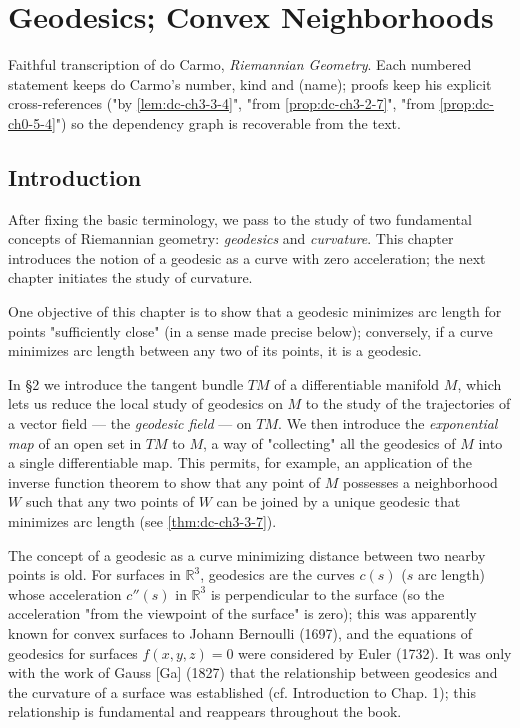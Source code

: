 \chapter{Geodesics; Convex Neighborhoods}
\label{chap:dc-geodesics-convex-neighborhoods}

Faithful transcription of do Carmo, \emph{Riemannian Geometry}. Each numbered
statement keeps do Carmo's number, kind and (name); proofs keep his explicit
cross-references ("by \cref{lem:dc-ch3-3-4}", "from \cref{prop:dc-ch3-2-7}", "from \cref{prop:dc-ch0-5-4}") so the dependency graph is recoverable from the text.

\section{Introduction}

After fixing the basic terminology, we pass to the study of two fundamental
concepts of Riemannian geometry: \emph{geodesics} and \emph{curvature}. This chapter
introduces the notion of a geodesic as a curve with zero acceleration; the next
chapter initiates the study of curvature.

One objective of this chapter is to show that a geodesic minimizes arc length
for points "sufficiently close" (in a sense made precise below); conversely, if
a curve minimizes arc length between any two of its points, it is a geodesic.

In §2 we introduce the tangent bundle $TM$ of a differentiable manifold $M$,
which lets us reduce the local study of geodesics on $M$ to the study of the
trajectories of a vector field — the \emph{geodesic field} — on $TM$. We then
introduce the \emph{exponential map} of an open set in $TM$ to $M$, a way of
"collecting" all the geodesics of $M$ into a single differentiable map. This
permits, for example, an application of the inverse function theorem to show that
any point of $M$ possesses a neighborhood $W$ such that any two points of $W$ can
be joined by a unique geodesic that minimizes arc length (see \cref{thm:dc-ch3-3-7}).

The concept of a geodesic as a curve minimizing distance between two nearby
points is old. For surfaces in $\mathbb{R}^3$, geodesics are the curves $c(s)$
($s$ arc length) whose acceleration $c''(s)$ in $\mathbb{R}^3$ is perpendicular
to the surface (so the acceleration "from the viewpoint of the surface" is zero);
this was apparently known for convex surfaces to Johann Bernoulli (1697), and the
equations of geodesics for surfaces $f(x,y,z)=0$ were considered by Euler (1732).
It was only with the work of Gauss [Ga] (1827) that the relationship between
geodesics and the curvature of a surface was established (cf. Introduction to
Chap. 1); this relationship is fundamental and reappears throughout the book.


